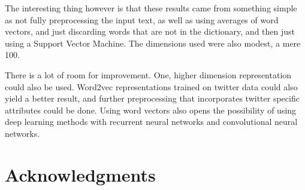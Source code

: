 \documentclass{llncs}
\begin{document}
The interesting thing however is that these results came from something simple as not fully preprocessing the input text, as well as using averages of word vectors, and just discarding words that are not in the dictionary, and then just using a Support Vector Machine. The dimensions used were also modest, a mere 100. 

There is a lot of room for improvement. One, higher dimension representation could also be used. Word2vec representations trained on twitter data could also yield a better result, and further preprocessing that incorporates twitter specific attributes could be done. Using word vectors also opens the possibility of using deep learning methods with recurrent neural networks and convolutional neural networks. 

\section{Acknowledgments}




\begin{raggedright}

\end{raggedright}
\end{document}
